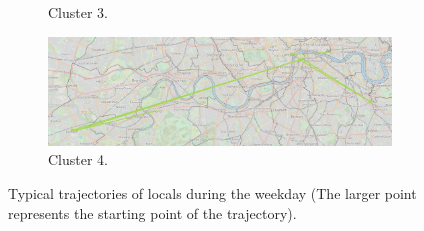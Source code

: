 \documentclass{article}
\theoremstyle{remark}
\begin{document}
\begin{figure}[!h]
\begin{subfigure}{0.6\textheight}
\caption{Cluster 3.}
\label{fig:weekday_locals_c3}
\end{subfigure}
\begin{subfigure}{0.6\textheight}
\centering
\includegraphics[width=0.4\linewidth]{figures/weekday_locals_c4.png}
\caption{Cluster 4.}
\label{fig:weekday_locals_c4}
\end{subfigure}

\caption{Typical trajectories of locals during the weekday (The larger point represents the starting point of the trajectory).}
\label{fig:sequences_weekday_locals}
\end{figure}
\end{document}
